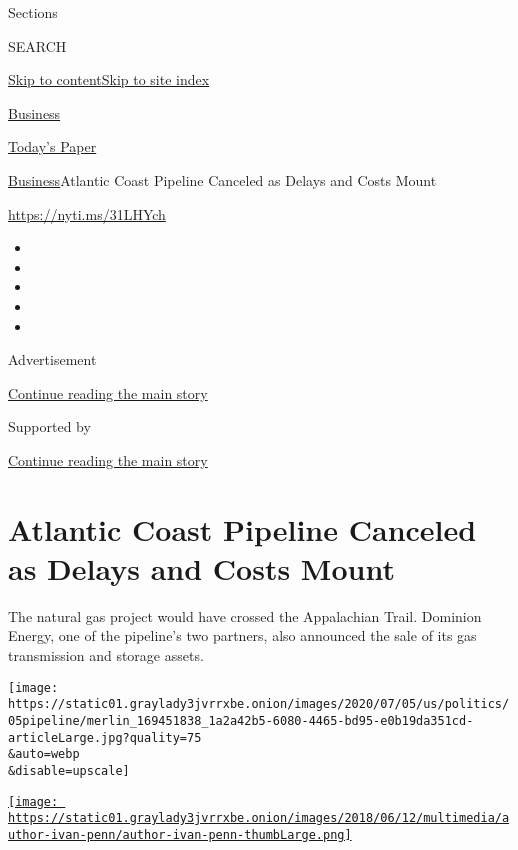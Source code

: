 Sections

SEARCH

\protect\hyperlink{site-content}{Skip to
content}\protect\hyperlink{site-index}{Skip to site index}

\href{https://www.nytimes3xbfgragh.onion/section/business}{Business}

\href{https://myaccount.nytimes3xbfgragh.onion/auth/login?response_type=cookie\&client_id=vi}{}

\href{https://www.nytimes3xbfgragh.onion/section/todayspaper}{Today's
Paper}

\href{/section/business}{Business}\textbar{}Atlantic Coast Pipeline
Canceled as Delays and Costs Mount

\url{https://nyti.ms/31LHYch}

\begin{itemize}
\item
\item
\item
\item
\item
\end{itemize}

Advertisement

\protect\hyperlink{after-top}{Continue reading the main story}

Supported by

\protect\hyperlink{after-sponsor}{Continue reading the main story}

\hypertarget{atlantic-coast-pipeline-canceled-as-delays-and-costs-mount}{%
\section{Atlantic Coast Pipeline Canceled as Delays and Costs
Mount}\label{atlantic-coast-pipeline-canceled-as-delays-and-costs-mount}}

The natural gas project would have crossed the Appalachian Trail.
Dominion Energy, one of the pipeline's two partners, also announced the
sale of its gas transmission and storage assets.

\texttt{[image: https://static01.graylady3jvrrxbe.onion/images/2020/07/05/us/politics/05pipeline/merlin\_169451838\_1a2a42b5-6080-4465-bd95-e0b19da351cd-articleLarge.jpg?quality=75\\\&auto=webp\\\&disable=upscale]}

\href{https://www.nytimes3xbfgragh.onion/by/ivan-penn}{\texttt{[image: https://static01.graylady3jvrrxbe.onion/images/2018/06/12/multimedia/author-ivan-penn/author-ivan-penn-thumbLarge.png]}}


